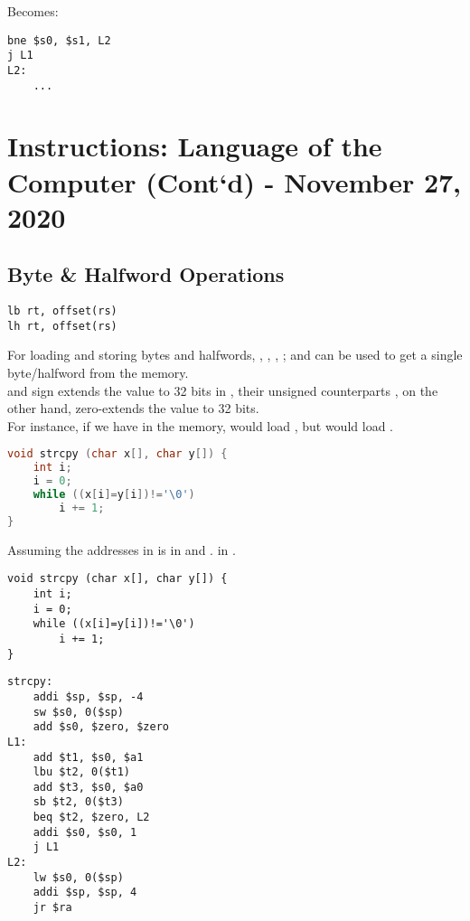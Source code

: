 \documentclass[11pt,a4paper,twocolumn]{book}
\begin{document}
Becomes:

\begin{lstlisting}
bne $s0, $s1, L2
j L1
L2:
	...
\end{lstlisting}

\chapter{Instructions: Language of the Computer (Cont`d) - November 27, 2020}

\section{Byte \& Halfword Operations}


\begin{lstlisting}
lb rt, offset(rs)
lh rt, offset(rs)
\end{lstlisting}

For loading and storing bytes and halfwords, , , , ;  and  can be used to get a single byte/halfword from the memory.\\

 and  sign extends the value to 32 bits in , their unsigned counterparts ,  on the other hand, zero-extends the value to 32 bits.\\
 
For instance, if we have  in the memory,  would load , but  would load .


\begin{lstlisting}[language=C]
void strcpy (char x[], char y[]) {
	int i;
	i = 0;
	while ((x[i]=y[i])!='\0')
		i += 1;
}
\end{lstlisting}

Assuming the addresses in  is in  and .  in .

\begin{lstlisting}
void strcpy (char x[], char y[]) {
	int i;
	i = 0;
	while ((x[i]=y[i])!='\0')
		i += 1;
}
\end{lstlisting}

\begin{lstlisting}
strcpy:
	addi $sp, $sp, -4
	sw $s0, 0($sp)
	add $s0, $zero, $zero
L1: 
	add $t1, $s0, $a1
	lbu $t2, 0($t1)
	add $t3, $s0, $a0
	sb $t2, 0($t3)
	beq $t2, $zero, L2
	addi $s0, $s0, 1
	j L1
L2:
	lw $s0, 0($sp)
	addi $sp, $sp, 4
	jr $ra
\end{lstlisting}
\end{document}
